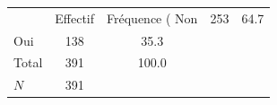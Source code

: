 {
\def\sym#1{\ifmmode^{#1}\else\(^{#1}\)\fi}
\begin{tabular}{l*{1}{cc}}
\toprule
            &    Effectif&Fréquence (%
\midrule
Non         &         253&        64.7\\
Oui         &         138&        35.3\\
Total       &         391&       100.0\\
\midrule
\(N\)       &         391&            \\
\bottomrule
\end{tabular}
}

